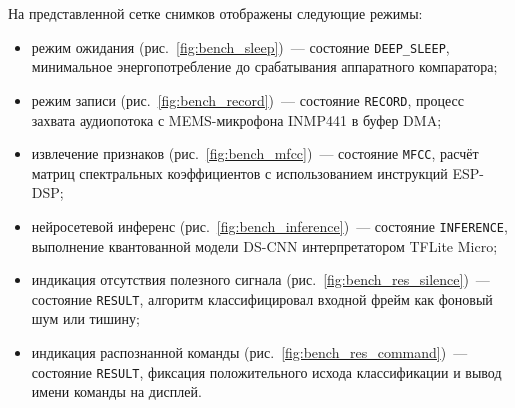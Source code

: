 На представленной сетке снимков отображены следующие режимы:
\begin{itemize}
	\item режим ожидания (рис.~\ref{fig:bench_sleep})~--- состояние \texttt{DEEP\_SLEEP},
	      минимальное энергопотребление до срабатывания аппаратного компаратора;
	\item режим записи (рис.~\ref{fig:bench_record})~--- состояние \texttt{RECORD},
	      процесс захвата аудиопотока с MEMS-микрофона INMP441 в буфер DMA;
	\item извлечение признаков (рис.~\ref{fig:bench_mfcc})~--- состояние \texttt{MFCC},
	      расчёт матриц спектральных коэффициентов с использованием инструкций ESP-DSP;
	\item нейросетевой инференс (рис.~\ref{fig:bench_inference})~--- состояние \texttt{INFERENCE},
	      выполнение квантованной модели DS-CNN интерпретатором TFLite Micro;
	\item индикация отсутствия полезного сигнала (рис.~\ref{fig:bench_res_silence})~--- состояние \texttt{RESULT},
	      алгоритм классифицировал входной фрейм как фоновый шум или тишину;
	\item индикация распознанной команды (рис.~\ref{fig:bench_res_command})~--- состояние \texttt{RESULT},
	      фиксация положительного исхода классификации и вывод имени команды на дисплей.
\end{itemize}


